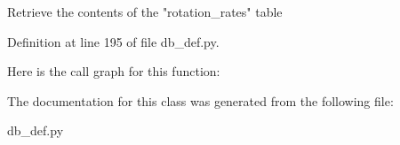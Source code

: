 \begin{DoxyVerb}Retrieve the contents of the "rotation_rates" table
\end{DoxyVerb}
 

Definition at line 195 of file db\+\_\+def.\+py.

Here is the call graph for this function\+:


The documentation for this class was generated from the following file\+:\begin{DoxyCompactItemize}
\item 
db\+\_\+def.\+py\end{DoxyCompactItemize}
